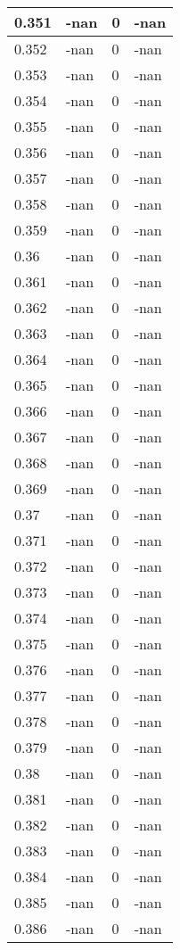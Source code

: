 \documentclass[a4paper,14pt]{extarticle}
\begin{document}
\begin{longtable}{||m{3cm}||m{3cm}|m{3cm}||m{3cm}||}
\hline
0.351 & -nan & 0 & -nan\\
\hline
0.352 & -nan & 0 & -nan\\
\hline
0.353 & -nan & 0 & -nan\\
\hline
0.354 & -nan & 0 & -nan\\
\hline
0.355 & -nan & 0 & -nan\\
\hline
0.356 & -nan & 0 & -nan\\
\hline
0.357 & -nan & 0 & -nan\\
\hline
0.358 & -nan & 0 & -nan\\
\hline
0.359 & -nan & 0 & -nan\\
\hline
0.36 & -nan & 0 & -nan\\
\hline
0.361 & -nan & 0 & -nan\\
\hline
0.362 & -nan & 0 & -nan\\
\hline
0.363 & -nan & 0 & -nan\\
\hline
0.364 & -nan & 0 & -nan\\
\hline
0.365 & -nan & 0 & -nan\\
\hline
0.366 & -nan & 0 & -nan\\
\hline
0.367 & -nan & 0 & -nan\\
\hline
0.368 & -nan & 0 & -nan\\
\hline
0.369 & -nan & 0 & -nan\\
\hline
0.37 & -nan & 0 & -nan\\
\hline
0.371 & -nan & 0 & -nan\\
\hline
0.372 & -nan & 0 & -nan\\
\hline
0.373 & -nan & 0 & -nan\\
\hline
0.374 & -nan & 0 & -nan\\
\hline
0.375 & -nan & 0 & -nan\\
\hline
0.376 & -nan & 0 & -nan\\
\hline
0.377 & -nan & 0 & -nan\\
\hline
0.378 & -nan & 0 & -nan\\
\hline
0.379 & -nan & 0 & -nan\\
\hline
0.38 & -nan & 0 & -nan\\
\hline
0.381 & -nan & 0 & -nan\\
\hline
0.382 & -nan & 0 & -nan\\
\hline
0.383 & -nan & 0 & -nan\\
\hline
0.384 & -nan & 0 & -nan\\
\hline
0.385 & -nan & 0 & -nan\\
\hline
0.386 & -nan & 0 & -nan\\

\end{longtable}
\end{document}
